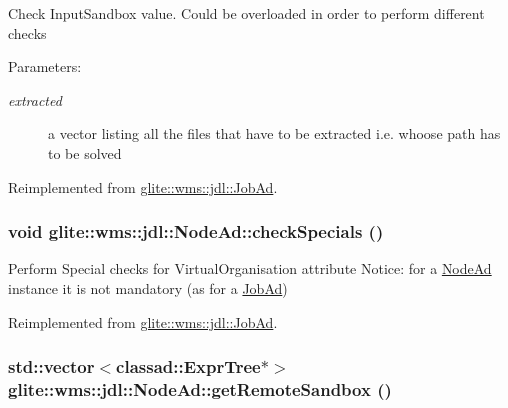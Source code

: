 Check Input\-Sandbox value. Could be overloaded in order to perform different checks \begin{Desc}
\item[Parameters:]
\begin{description}
\item[{\em extracted}]a vector listing all the files that have to be extracted i.e. whoose path has to be solved\end{description}
\end{Desc}


Reimplemented from \hyperlink{classglite_1_1wms_1_1jdl_1_1JobAd_b0}{glite::wms::jdl::Job\-Ad}.\hypertarget{classglite_1_1wms_1_1jdl_1_1NodeAd_b1}{
\subsubsection[checkSpecials]{\setlength{\rightskip}{0pt plus 5cm}void glite::wms::jdl::Node\-Ad::check\-Specials ()}}
\label{classglite_1_1wms_1_1jdl_1_1NodeAd_b1}


Perform Special checks for Virtual\-Organisation attribute Notice: for a \hyperlink{classglite_1_1wms_1_1jdl_1_1NodeAd}{Node\-Ad} instance it is not mandatory (as for a \hyperlink{classglite_1_1wms_1_1jdl_1_1JobAd}{Job\-Ad}) 

Reimplemented from \hyperlink{classglite_1_1wms_1_1jdl_1_1JobAd}{glite::wms::jdl::Job\-Ad}.\hypertarget{classglite_1_1wms_1_1jdl_1_1NodeAd_a3}{
\subsubsection[getRemoteSandbox]{\setlength{\rightskip}{0pt plus 5cm}std::vector$<$classad::Expr\-Tree$\ast$$>$ glite::wms::jdl::Node\-Ad::get\-Remote\-Sandbox ()}}
\label{classglite_1_1wms_1_1jdl_1_1NodeAd_a3}


